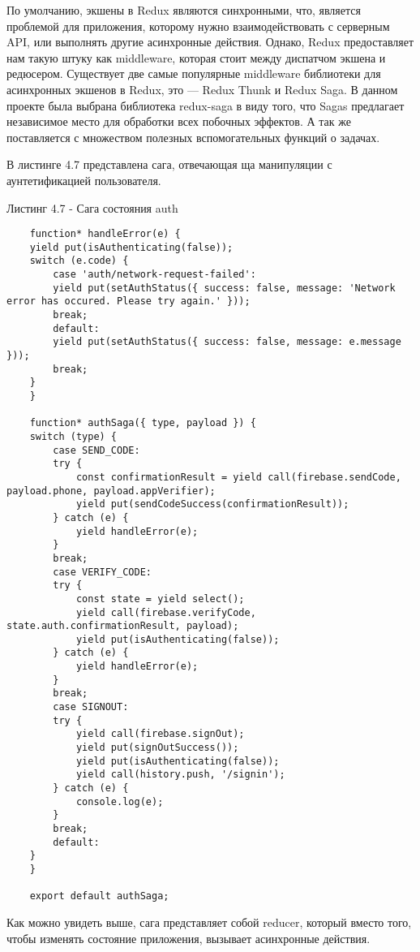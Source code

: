 По умолчанию, экшены в Redux являются синхронными, что, является проблемой для приложения, которому нужно взаимодействовать с серверным API, или выполнять другие асинхронные действия.
Однако, Redux предоставляет нам такую штуку как middleware, которая стоит между диспатчом экшена и редюсером.
Существует две самые популярные middleware библиотеки для асинхронных экшенов в Redux, это — Redux Thunk и Redux Saga.
В данном проекте была выбрана библиотека redux-saga в виду того, что Sagas предлагает независимое место для обработки всех побочных эффектов.
А так же поставляется с множеством полезных вспомогательных функций о задачах.

В листинге 4.7 представлена сага, отвечающая ща манипуляции с аунтетификацией пользователя.

Листинг 4.7 - Сага состояния auth
\begin{lstlisting}
    function* handleError(e) {
    yield put(isAuthenticating(false));
    switch (e.code) {
        case 'auth/network-request-failed':
        yield put(setAuthStatus({ success: false, message: 'Network error has occured. Please try again.' }));
        break;
        default:
        yield put(setAuthStatus({ success: false, message: e.message }));
        break;
    }
    }

    function* authSaga({ type, payload }) {
    switch (type) {
        case SEND_CODE:
        try {
            const confirmationResult = yield call(firebase.sendCode, payload.phone, payload.appVerifier);
            yield put(sendCodeSuccess(confirmationResult));
        } catch (e) {
            yield handleError(e);
        }
        break;
        case VERIFY_CODE:
        try {
            const state = yield select();
            yield call(firebase.verifyCode, state.auth.confirmationResult, payload);
            yield put(isAuthenticating(false));
        } catch (e) {
            yield handleError(e);
        }
        break;
        case SIGNOUT:
        try {
            yield call(firebase.signOut);
            yield put(signOutSuccess());
            yield put(isAuthenticating(false));
            yield call(history.push, '/signin');
        } catch (e) {
            console.log(e);
        }
        break;
        default:
    }
    }

    export default authSaga;
\end{lstlisting}

Как можно увидеть выше, сага представляет собой reducer, который вместо того, чтобы изменять состояние приложения, вызывает асинхронные действия.

